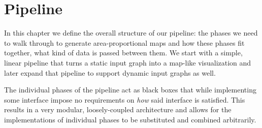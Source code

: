 \chapter{Pipeline}
\label{chap:pipeline}

In this chapter we define the overall structure of our pipeline: the phases we need to walk through to generate area-proportional maps and how these phases fit together, \ie{} what kind of data is passed between them. We start with a simple, linear pipeline that turns a static input graph into a map-like visualization and later expand that pipeline to support dynamic input graphs as well.

The individual phases of the pipeline act as black boxes that \emdash{} while implementing some interface \emdash{} impose no requirements on \emph{how} said interface is satisfied. This results in a very modular, loosely-coupled architecture and allows for the implementations of individual phases to be substituted and combined arbitrarily.



\clearpage

